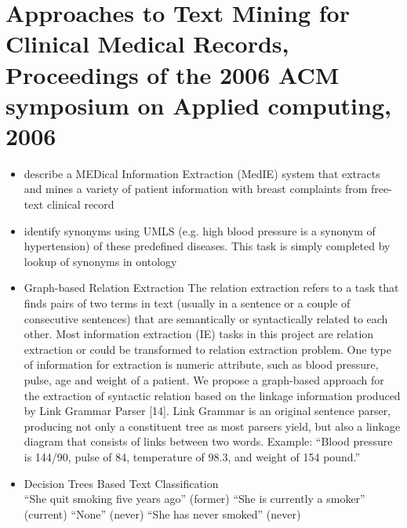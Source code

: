 \documentclass[pdftext,twoside,11pt]{article}
\begin{document}
\section{Approaches to Text Mining for Clinical Medical Records,
Proceedings of the 2006 ACM symposium on Applied computing, 2006}
\label{sec:intro} 
\begin{itemize}
\item describe a MEDical Information Extraction (MedIE) system 
that extracts and mines a variety of patient information with 
breast complaints from free-text clinical record
\item identify synonyms using UMLS 
(e.g. high blood pressure is a synonym of hypertension) of these 
predefined diseases. This task is simply completed by lookup of 
synonyms in ontology 
\item Graph-based Relation Extraction 
The relation extraction refers to a task that finds pairs of two 
terms in text (usually in a sentence or a couple of consecutive 
sentences) that are semantically or syntactically related to each 
other. Most information extraction (IE) tasks in this project are 
relation extraction or could be transformed to relation extraction 
problem. One type of information for extraction is numeric 
attribute, such as blood pressure, pulse, age and weight of a 
patient. We propose a graph-based approach for  the  extraction  of 
syntactic relation based on the linkage information produced by
Link Grammar Parser [14]. Link Grammar is an original sentence 
parser, producing not only a constituent tree as most parsers yield, 
but  also  a linkage diagram that  consists of links between two 
words. Example: “Blood pressure is 144/90, pulse of 84, temperature of 98.3, 
and weight of 154 pound.”
\item Decision Trees Based Text Classification\\
“She quit smoking five years ago” (former)
“She is currently a smoker” (current)
“None” (never)
“She has never smoked” (never)
\end{itemize}

\end{document}
